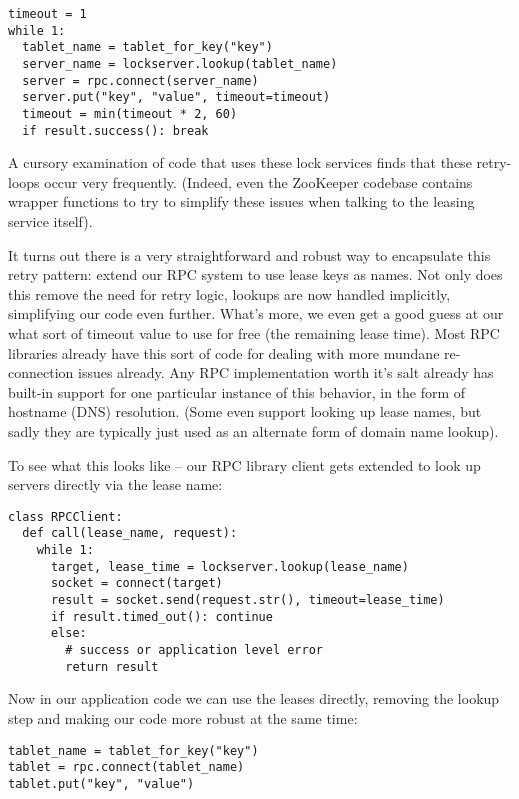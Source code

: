 \documentclass[psfig,10pt]{article}
\begin{document}
\begin{lstlisting}[caption=Fixed BigTable lookup.]
timeout = 1
while 1:
  tablet_name = tablet_for_key("key")
  server_name = lockserver.lookup(tablet_name)
  server = rpc.connect(server_name)
  server.put("key", "value", timeout=timeout)
  timeout = min(timeout * 2, 60)
  if result.success(): break
\end{lstlisting}

A cursory examination of code that uses these lock services finds that these
retry-loops occur very frequently.  (Indeed, even the ZooKeeper codebase
contains wrapper functions to try to simplify these issues when talking to the
leasing service itself). 

It turns out there is a very straightforward and robust way to encapsulate this
retry pattern: extend our RPC system to use lease keys as names. Not only does
this remove the need for retry logic, lookups are now handled implicitly,
simplifying our code even further.  What's more, we even get a good guess at
our what sort of timeout value to use for free (the remaining lease time).  Most
RPC libraries already have this sort of code for dealing with more mundane 
re-connection issues already.  Any RPC implementation worth it's salt already 
has built-in support for one particular instance of this behavior, in the form 
of hostname (DNS) resolution.  (Some even support looking up lease names,
but sadly they are typically just used as an alternate form of domain name 
lookup).

To see what this looks like -- our RPC library client gets extended to look up 
servers directly via the lease name:

\begin{lstlisting}[caption=Resolution integrated into RPC library.]
class RPCClient:
  def call(lease_name, request):
    while 1:
      target, lease_time = lockserver.lookup(lease_name)
      socket = connect(target)
      result = socket.send(request.str(), timeout=lease_time)
      if result.timed_out(): continue
      else:
        # success or application level error
        return result
\end{lstlisting}

Now in our application code we can use the leases directly, removing the lookup
step and making our code more robust at the same time:

\begin{lstlisting}[caption={Simple BigTable lookup, take 2.}]
tablet_name = tablet_for_key("key")
tablet = rpc.connect(tablet_name)
tablet.put("key", "value")
\end{lstlisting}
\end{document}
